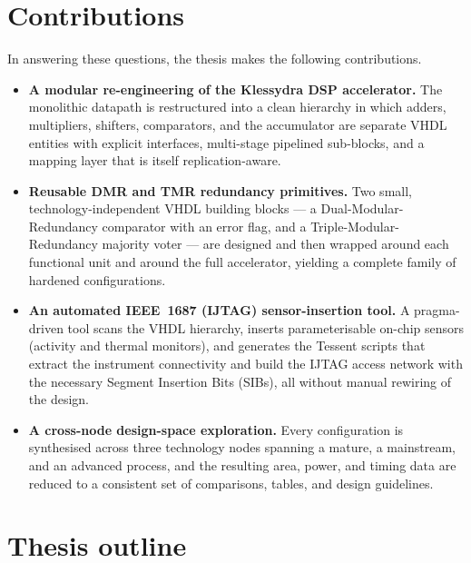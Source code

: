 \section{Contributions}

In answering these questions, the thesis makes the following contributions.

\begin{itemize}
  \item \textbf{A modular re-engineering of the Klessydra DSP accelerator.}
        The monolithic datapath is restructured into a clean hierarchy in which
        adders, multipliers, shifters, comparators, and the accumulator are
        separate VHDL entities with explicit interfaces, multi-stage pipelined
        sub-blocks, and a mapping layer that is itself replication-aware.

  \item \textbf{Reusable DMR and TMR redundancy primitives.} Two small,
        technology-independent VHDL building blocks --- a Dual-Modular-Redundancy
        comparator with an error flag, and a Triple-Modular-Redundancy majority
        voter --- are designed and then wrapped around each functional unit and
        around the full accelerator, yielding a complete family of hardened
        configurations.

  \item \textbf{An automated IEEE~1687 (IJTAG) sensor-insertion tool.} A
        pragma-driven tool scans the VHDL hierarchy, inserts parameterisable
        on-chip sensors (activity and thermal monitors), and generates the
        Tessent scripts that extract the instrument connectivity and build the
        IJTAG access network with the necessary Segment Insertion Bits (SIBs),
        all without manual rewiring of the design.

  \item \textbf{A cross-node design-space exploration.} Every configuration is
        synthesised across three technology nodes spanning a mature, a
        mainstream, and an advanced process, and the resulting area, power, and
        timing data are reduced to a consistent set of comparisons, tables, and
        design guidelines.
\end{itemize}

\section{Thesis outline}


